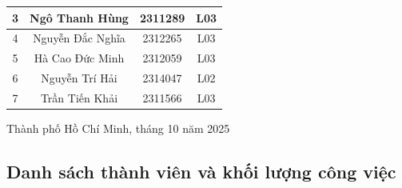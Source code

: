 \documentclass[a4paper, 15pt]{article}
\begin{document}
\begin{titlepage}
\begin{center}
\begin{tabular}{|c|c|c|c|}
\hline
{3} & {Ngô Thanh Hùng} & {2311289 } & {L03} \\

\hline
{4} & {Nguyễn Đắc Nghĩa} & {2312265 } & {L03} \\

\hline
{5} & {Hà Cao Đức Minh} & {2312059} & {L03} \\

\hline
{6} & {Nguyễn Trí Hải} & {2314047} & {L02} \\

\hline
{7} & {Trần Tiến Khải} & {2311566 
} & {L03} \\

\hline


\end{tabular}

\vfill
Thành phố Hồ Chí Minh, tháng 10 năm 2025

\end{center}
\end{titlepage}

\newpage
\tableofcontents
\newpage

\begin{center}
\section*{Danh sách thành viên và khối lượng công việc}
\end{center}


\end{document}
